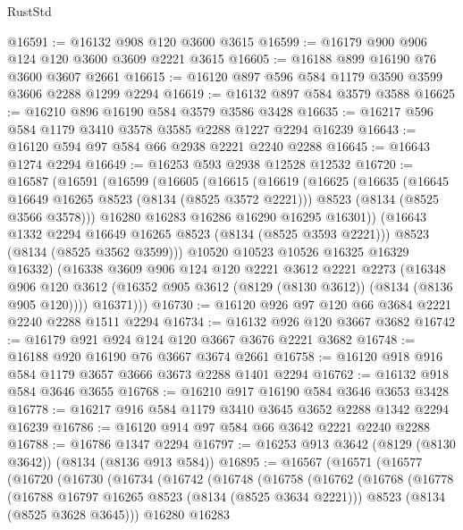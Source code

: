 \begin{lexlean}{RustStd}
\begin{coremodule}
@16591 := @16132 @908 @120 @3600 @3615
@16599 := @16179 @900 @906 @124 @120 @3600 @3609 @2221 @3615
@16605 := @16188 @899 @16190 @76 @3600 @3607 @2661
@16615 := @16120 @897 @596 @584 @1179 @3590 @3599 @3606 @2288 @1299 @2294
@16619 := @16132 @897 @584 @3579 @3588
@16625 := @16210 @896 @16190 @584 @3579 @3586 @3428
@16635 := @16217 @596 @584 @1179 @3410 @3578 @3585 @2288 @1227 @2294 @16239
@16643 := @16120 @594 @97 @584 @66 @2938 @2221 @2240 @2288
@16645 := @16643 @1274 @2294
@16649 := @16253 @593 @2938 @12528 @12532
@16720 := @16587
    (@16591
      (@16599
        (@16605
          (@16615
            (@16619
              (@16625
                (@16635
                  (@16645 @16649 @16265 @8523 (@8134 (@8525 @3572 @2221)))
                  @8523
                  (@8134 (@8525 @3566 @3578)))
                @16280
                @16283
                @16286
                @16290
                @16295
                @16301))
            (@16643 @1332 @2294 @16649 @16265 @8523 (@8134 (@8525 @3593 @2221)))
            @8523
            (@8134 (@8525 @3562 @3599)))
          @10520
          @10523
          @10526
          @16325
          @16329
          @16332)
        (@16338
          @3609
          @906
          @124
          @120
          @2221
          @3612
          @2221
          @2273
          (@16348
            @906
            @120
            @3612
            (@16352 @905 @3612 (@8129 (@8130 @3612)) (@8134 (@8136 @905 @120))))
          @16371)))
@16730 := @16120 @926 @97 @120 @66 @3684 @2221 @2240 @2288 @1511 @2294
@16734 := @16132 @926 @120 @3667 @3682
@16742 := @16179 @921 @924 @124 @120 @3667 @3676 @2221 @3682
@16748 := @16188 @920 @16190 @76 @3667 @3674 @2661
@16758 := @16120 @918 @916 @584 @1179 @3657 @3666 @3673 @2288 @1401 @2294
@16762 := @16132 @918 @584 @3646 @3655
@16768 := @16210 @917 @16190 @584 @3646 @3653 @3428
@16778 := @16217 @916 @584 @1179 @3410 @3645 @3652 @2288 @1342 @2294 @16239
@16786 := @16120 @914 @97 @584 @66 @3642 @2221 @2240 @2288
@16788 := @16786 @1347 @2294
@16797 := @16253 @913 @3642 (@8129 (@8130 @3642)) (@8134 (@8136 @913 @584))
@16895 := @16567
    (@16571
      (@16577
        (@16720
          (@16730
            (@16734
              (@16742
                (@16748
                  (@16758
                    (@16762
                      (@16768
                        (@16778
                          (@16788 @16797 @16265 @8523 (@8134 (@8525 @3634 @2221)))
                          @8523
                          (@8134 (@8525 @3628 @3645)))
                        @16280
                        @16283

\end{coremodule}
\end{lexlean}
